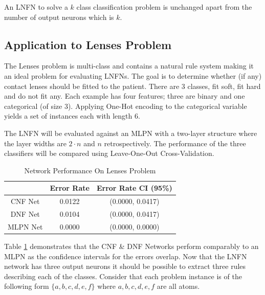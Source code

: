 \begin{definition}
	An LNFN to solve a $k$ class classification problem is unchanged apart from the number of output neurons which is $k$.
\end{definition}

\subsection{Application to Lenses Problem}
The Lenses problem \cite{Lichman:2013} is multi-class and contains a natural rule system making it an ideal problem for evaluating LNFNs. The goal is to determine whether (if any) contact lenses should be fitted to the patient. There are 3 classes, fit soft, fit hard and do not fit any. Each example has four features; three are binary and one categorical (of size 3). Applying One-Hot encoding to the categorical variable yields a set of instances each with length 6.\\


\noindent
\begin{minipage}[t]{0.35\textwidth}
	\vspace{0px}
	The LNFN will be evaluated against an MLPN with a two-layer structure where the layer widths are $2 \cdot n$ and $n$ retrospectively. The performance of the three classifiers will be compared using Leave-One-Out Cross-Validation.
\end{minipage}
\hspace{0.05\textwidth}
\begin{minipage}[t]{0.6\textwidth}
	\vspace{0px}
	\begin{table}[H]
		\begin{center}
			\begin{tabular}{| c | c | c |}
				\hline
				& Error Rate & Error Rate CI (95\%) \\
				\hline
				\hline
				CNF Net & 0.0122 & (0.0000, 0.0417) \\
				\hline
				DNF Net & 0.0104 & (0.0000, 0.0417) \\
				\hline
				MLPN Net & 0.0000 & (0.0000, 0.0000) \\
				\hline
			\end{tabular}
		\end{center}
		\caption{Network Performance On Lenses Problem}
		\label{tab:lenses-peformance-comp}
	\end{table}
\end{minipage}

Table \ref{tab:lenses-peformance-comp} demonstrates that the CNF \& DNF Networks perform comparably to an MLPN as the confidence intervals for the errors overlap. Now that the LNFN network has three output neurons it should be possible to extract three rules describing each of the classes. Consider that each problem instance is of the following form $\{a, b, c, d, e, f\}$ where $a,b,c,d,e,f$ are all atoms.\\


